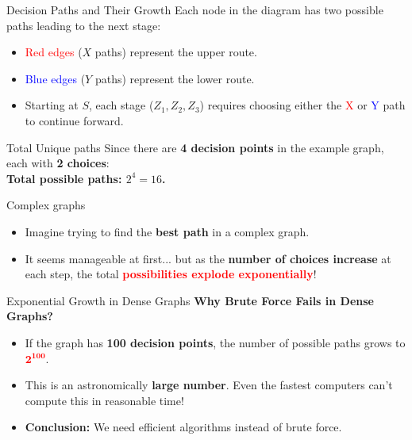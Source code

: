 \documentclass{beamer}
\begin{document}
\begin{frame}{Decision Paths and Their Growth}
        Each node in the diagram has two possible paths leading to the next stage: 
    
        \begin{itemize}
            \item \textcolor{red}{Red edges} (\(X\) paths) represent the upper route.  
            \item \textcolor{blue}{Blue edges} (\(Y\) paths) represent the lower route.  
            \item Starting at \( S \), each stage (\(Z_1, Z_2, Z_3\)) requires choosing either the \textcolor{red}{X} or \textcolor{blue}{Y} path to continue forward.  
        \end{itemize}  
    
    \end{frame}
    
    \begin{frame}{Total Unique paths}
        Since there are \textbf{4 decision points} in the example graph, each with \textbf{2 choices}: \\
        \textbf{Total possible paths: $2^4 = 16$.}
    \end{frame}

    \begin{frame}{Complex graphs}

        \begin{itemize}
            \item Imagine trying to find the \textbf{best path} in a complex graph.\\
            \item It seems manageable at first... but as the \textbf{number of choices increase} at each step, the total \textcolor{red}{\textbf{possibilities explode exponentially}}! 
        \end{itemize}
    \end{frame}

    
    \begin{frame}{Exponential Growth in Dense Graphs}
        \textbf{Why Brute Force Fails in Dense Graphs?}
        
        \begin{itemize}
            \item If the graph has \textbf{100 decision points}, the number of possible paths grows to \textcolor{red}{\( \mathbf{2^{100}} \)}.
            \item This is an astronomically\textbf{ large number}. Even the fastest computers can't compute this in reasonable time!
            \item \textbf{Conclusion:} We need efficient algorithms instead of brute force.
        \end{itemize}
    
    \end{frame}
    
\end{document}
